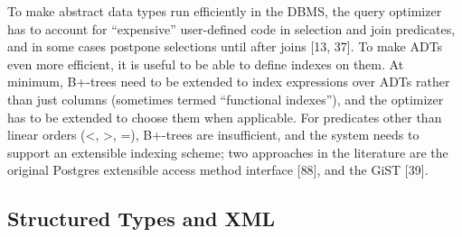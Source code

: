 \documentclass[b5paper,11pt,twoside,openright]{book}
\begin{document}
To make abstract data types run efficiently in the DBMS, the query
optimizer has to account for ``expensive'' user-defined code in
selection and join predicates, and in some cases postpone selections
until after joins {[}13, 37{]}. To make ADTs even more efficient, it is
useful to be able to define indexes on them. At minimum, B+-trees need
to be extended to index expressions over ADTs rather than just columns
(sometimes termed ``functional indexes''), and the optimizer has to be
extended to choose them when applicable. For predicates other than
linear orders (\textless{}, \textgreater{}, =), B+-trees are
insufficient, and the system needs to support an extensible indexing
scheme; two approaches in the literature are the original Postgres
extensible access method interface {[}88{]}, and the GiST {[}39{]}.

\hypertarget{structured-types-and-xml}{%
\subsection{Structured Types and
XML}\label{structured-types-and-xml}}
\end{document}
